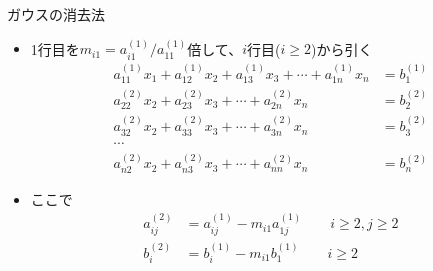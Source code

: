 \begin{frame}[t,fragile]{ガウスの消去法}
  \begin{itemize}
    \setlength{\itemsep}{1em}
  \item 1行目を$m_{i1} = a_{i1}^{(1)}/a_{11}^{(1)}$倍して、$i$行目($i \ge 2$)から引く
    \begin{align*}
    a_{11}^{(1)} x_1 + a_{12}^{(1)} x_2 + a_{13}^{(1)} x_3 + \cdots + a_{1n}^{(1)} x_n &= b_{1}^{(1)} \\
    a_{22}^{(2)} x_2 + a_{23}^{(2)} x_3 + \cdots + a_{2n}^{(2)} x_n &= b_{2}^{(2)} \\
    a_{32}^{(2)} x_2 + a_{33}^{(2)} x_3 + \cdots + a_{3n}^{(2)} x_n &= b_{3}^{(2)} \\
    \cdots \\
    a_{n2}^{(2)} x_2 + a_{n3}^{(2)} x_3 + \cdots + a_{nn}^{(2)} x_n &= b_{n}^{(2)}
    \end{align*}
  \item ここで
    \begin{align*}
      a_{ij}^{(2)} &= a_{ij}^{(1)} - m_{i1} a_{1j}^{(1)} \qquad i \ge 2, j \ge 2 \\
      b_{i}^{(2)} &= b_{i}^{(1)} - m_{i1} b_{1}^{(1)} \qquad i \ge 2
    \end{align*}
  \end{itemize}
\end{frame}
